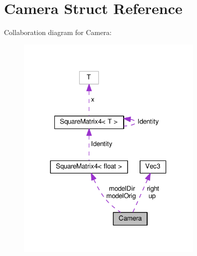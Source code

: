 \hypertarget{struct_camera}{}\section{Camera Struct Reference}
\label{struct_camera}


Collaboration diagram for Camera\+:
\nopagebreak
\begin{figure}[H]
\begin{center}
\leavevmode
\includegraphics[width=254pt]{struct_camera__coll__graph}
\end{center}
\end{figure}
